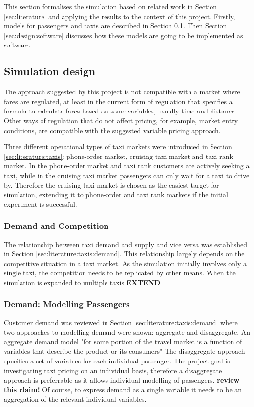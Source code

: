 This section formalises the simulation based on related work in Section
\ref{sec:literature} and applying the results to the context of this project.
Firstly, models for passengers and taxis are described in Section
\ref{sec:design:simulation}. Then Section \ref{sec:design:software} discusses
how these models are going to be implemented as software.

\subsection{Simulation design}
\label{sec:design:simulation}

The approach suggested by this project is not compatible with a market where
fares are regulated, at least in the current form of regulation that specifies
a formula to calculate fares based on some variables, usually time and
distance. Other ways of regulation that do not affect pricing, for example,
market entry conditions, are compatible with the suggested variable pricing
approach.

Three different operational types of taxi markets were introduced in Section
\ref{sec:literature:taxis}: phone-order market, cruising taxi market and taxi
rank market. In the phone-order market and taxi rank customers are actively
seeking a taxi, while in the cruising taxi market passengers can only wait for
a taxi to drive by. Therefore the cruising taxi market is chosen as the easiest
target for simulation, extending it to phone-order and taxi rank markets if the
initial experiment is successful.


\subsubsection{Demand and Competition}

The relationship between taxi demand and supply and vice versa was established
in Section \ref{sec:literature:taxis:demand}. This relationship largely depends
on the competitive situation in a taxi market. As the simulation initially
involves only a single taxi, the competition needs to be replicated by other
means. When the simulation is expanded to multiple taxis \textbf{EXTEND}


\subsubsection{Demand: Modelling Passengers} 

Customer demand was reviewed in Section \ref{sec:literature:taxis:demand} where
two approaches to modelling demand were shown: aggregate and disaggregate. An
aggregate demand model "for some portion of the travel market is a function of
variables that describe the product or its consumers"
\parencite{Small2007taxi+urban} The disaggregate approach specifies a set of
variables for each individual passenger. The project goal is investigating taxi
pricing on an individual basis, therefore a disaggregate approach is
preferrable as it allows individual modelling of passengers. \textbf{review
this claim!} Of course, to express demand as a single variable it needs to be
an aggregation of the relevant individual variables.

